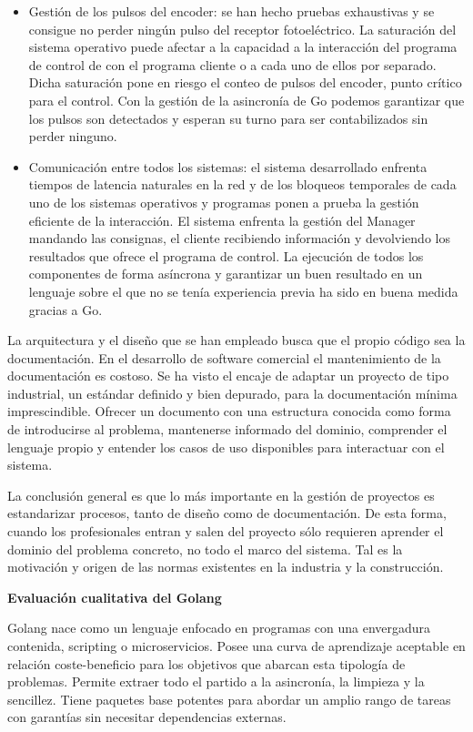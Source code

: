 \begin{itemize}
    \item Gestión de los pulsos del encoder: se han hecho pruebas exhaustivas y se consigue no perder ningún pulso del receptor fotoeléctrico.
    La saturación del sistema operativo puede afectar a la capacidad a la interacción del programa de control de con el programa cliente o a cada uno de ellos por separado.
    Dicha saturación pone en riesgo el conteo de pulsos del encoder, punto crítico para el control.
    Con la gestión de la asincronía de Go podemos garantizar que los pulsos son detectados y esperan su turno para ser contabilizados sin perder ninguno.
    \item Comunicación entre todos los sistemas: el sistema desarrollado enfrenta tiempos de latencia naturales en la red y de los bloqueos temporales de cada uno de los sistemas operativos y programas ponen a prueba la gestión eficiente de la interacción.
    El sistema enfrenta la gestión del Manager mandando las consignas, el cliente recibiendo información y devolviendo los resultados que ofrece el programa de control.
    La ejecución de todos los componentes de forma asíncrona y garantizar un buen resultado en un lenguaje sobre el que no se tenía experiencia previa ha sido en buena medida gracias a Go.
\end{itemize}

La arquitectura y el diseño que se han empleado busca que el propio código sea la documentación.
En el desarrollo de software comercial el mantenimiento de la documentación es costoso.
Se ha visto el encaje de adaptar un proyecto de tipo industrial, un estándar definido y bien depurado, para la documentación mínima imprescindible.
Ofrecer un documento con una estructura conocida como forma de introducirse al problema, mantenerse informado del dominio, comprender el lenguaje propio y entender los casos de uso disponibles para interactuar con el sistema.

La conclusión general es que lo más importante en la gestión de proyectos es estandarizar procesos, tanto de diseño como de documentación.
De esta forma, cuando los profesionales entran y salen del proyecto sólo requieren aprender el dominio del problema concreto, no todo el marco del sistema.
Tal es la motivación y origen de las normas existentes en la industria y la construcción.

\textbf{Evaluación cualitativa del Golang}

Golang nace como un lenguaje enfocado en programas con una envergadura contenida, scripting o microservicios.
Posee una curva de aprendizaje aceptable en relación coste-beneficio para los objetivos que abarcan esta tipología de problemas.
Permite extraer todo el partido a la asincronía, la limpieza y la sencillez.
Tiene paquetes base potentes para abordar un amplio rango de tareas con garantías sin necesitar dependencias externas.

